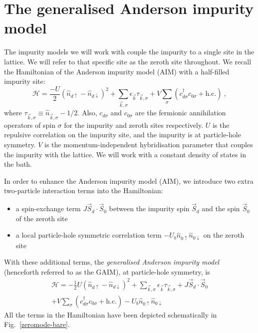 \documentclass[reprint,superscriptaddress,floatfix]{revtex4-2}
\begin{document}
\section{The generalised Anderson impurity model}

The impurity models we will work with couple the impurity to a single site in the lattice. We will refer to that specific site as the zeroth site throughout. We recall the Hamiltonian of the Anderson impurity model (AIM) with a half-filled impurity site:
\begin{equation} 
	\mathcal{H} = \frac{- U}{2} \left(\hat n_{d \uparrow} - \hat n_{d \downarrow}\right)^2 + \sum_{\vec k,\sigma} \epsilon_{\vec k} \tau_{\vec k,\sigma} + V\sum_\sigma \left( c^\dagger_{d\sigma}c_{0\sigma} + \text{h.c.}\right)~,
 \end{equation}
where \(\tau_{\vec k,\sigma} \equiv \hat n_{\vec k,\sigma} - 1/2\). Also, \(c_{d\sigma}\) and \(c_{0\sigma}\) are the fermionic annihilation operators of spin \(\sigma\) for the impurity and zeroth sites respectively. \(U\) is the repulsive correlation on the impurity site, and the impurity is at particle-hole symmetry. \(V\) is the momentum-independent hybridisation parameter that couples the impurity with the lattice. We will work with a constant density of states in the bath. 

In order to enhance the Anderson impurity model (AIM), we introduce two extra two-particle interaction terms into the Hamiltonian:
\begin{itemize}
	\item a spin-exchange term \(J \vec{S}_d\cdot\vec{S}_0\) between the impurity spin \(\vec S_d\) and the spin \(\vec S_0\) of the zeroth site 
	\item a local particle-hole symmetric correlation term \(-U_b \hat n_{0 \uparrow} \hat n_{0 \downarrow}\) on the zeroth site
\end{itemize}

With these additional terms, the {\it generalised Anderson impurity model} (henceforth referred to as the GAIM), at particle-hole symmetry, is
\begin{equation}\begin{aligned}
	\label{GIAM-ham}
	\mathcal{H} = -\frac{1}{2}U \left(\hat n_{d \uparrow} - \hat n_{d \downarrow}\right)^2 + \sum_{\vec k,\sigma} \epsilon_{\vec k} \tau_{\vec k,\sigma} + J \vec{S}_d\cdot\vec{S}_0 \\
	+ V\sum_\sigma \left( c^\dagger_{d\sigma}c_{0\sigma} + \text{h.c.}\right) - U_b \hat n_{0 \uparrow} \hat n_{0 \downarrow}
\end{aligned}\end{equation}
All the terms in the Hamiltonian have been depicted schematically in Fig.~\ref{zeromode-bare}.
\end{document}
